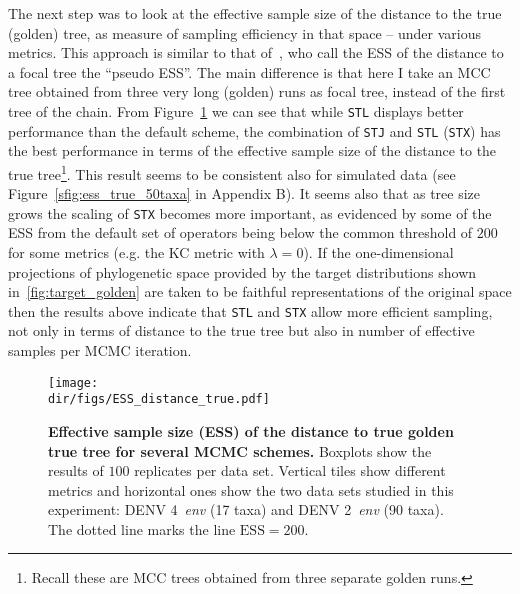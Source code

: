 The next step was to look at the effective sample size of the distance to the true (golden) tree, as measure of sampling efficiency in that space -- under various metrics.
This approach is similar to that of~\cite{Lanfear2016}, who call the ESS of the distance to a focal tree the ``pseudo ESS''.
The main difference is that here I take an MCC tree obtained from three very long (golden) runs as focal tree, instead of the first tree of the chain.
From Figure~\ref{fig:ESS_distance_true} we can see that while \verb|STL| displays better performance than the default scheme, the combination of \verb|STJ| and \verb|STL| (\verb|STX|) has the best performance in terms of the effective sample size of the distance to the true tree\footnote{Recall these are  MCC trees obtained from three separate golden runs.}.
This result seems to be consistent also for simulated data (see Figure~\ref{sfig:ess_true_50taxa} in Appendix B).
It seems also that as tree size grows the scaling of \verb|STX| becomes more important, as evidenced by some of the ESS from the default set of operators being below the common threshold of $200$ for some metrics (e.g. the KC metric with $\lambda = 0$).
If the one-dimensional projections of phylogenetic space provided by the target distributions shown in~\ref{fig:target_golden} are taken to be faithful representations of the original space then the results above indicate that \verb|STL| and \verb|STX|  allow more efficient sampling, not only in terms of distance to the true tree but also in number of effective samples per MCMC iteration.

\begin{figure}[!ht]
\begin{center}
\texttt{[image: \\dir/figs/ESS\_distance\_true.pdf]} 
\end{center}
 \caption[Effective sample size (ESS) of the distance to true golden true tree for several MCMC schemes.]{\textbf{Effective sample size (ESS) of the distance to true golden true tree for several MCMC schemes.}
   Boxplots show the results of $100$ replicates per data set.
  Vertical tiles show different metrics and horizontal ones show the two data sets studied in this experiment: DENV 4~\textit{env} (17 taxa) and DENV 2~\textit{env} (90 taxa).
  The dotted line marks the line $\text{ESS} = 200$.
  }
 \label{fig:ESS_distance_true}
\end{figure}

